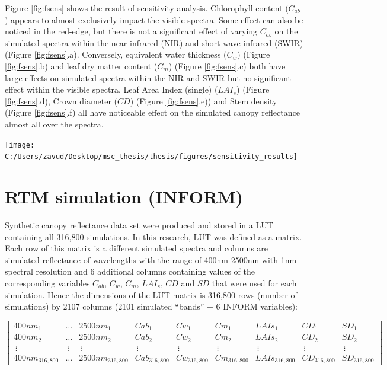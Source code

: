 \documentclass[a4paper, twoside]{templates/ociamthesis}
\let\origfigure\figure
\let\endorigfigure\endfigure
\renewenvironment{figure}[1][2] {
    \expandafter\origfigure\expandafter[H]
} {
    \endorigfigure
}
\begin{document}
Figure \ref{fig:fsens} shows the result of sensitivity analysis. Chlorophyll content (\(C_{ab}\)) appears to almost exclusively impact the visible spectra. Some effect can also be noticed in the red-edge, but there is not a significant effect of varying \(C_{ab}\) on the simulated spectra within the near-infrared (NIR) and short wave infrared (SWIR) (Figure \ref{fig:fsens}.a). Conversely, equivalent water thickness (\(C_{w}\)) (Figure \ref{fig:fsens}.b) and leaf dry matter content (\(C_{m}\)) (Figure \ref{fig:fsens}.c) both have large effects on simulated spectra within the NIR and SWIR but no significant effect within the visible spectra. Leaf Area Index (single) (\(LAI_{s}\)) (Figure \ref{fig:fsens}.d), Crown diameter (\(CD\)) (Figure \ref{fig:fsens}.e)) and Stem density (Figure \ref{fig:fsens}.f) all have noticeable effect on the simulated canopy reflectance almost all over the spectra.

\newpage

\begin{figure}

{\centering \texttt{[image: C:/Users/zavud/Desktop/msc\_thesis/thesis/figures/sensitivity\_results]} 

}

\caption{Effects of varying the chosen parameters on the simulated spectra}\label{fig:fsens}
\end{figure}

\newpage

\hypertarget{rtm-simulation-inform-1}{%
\section{RTM simulation (INFORM)}\label{rtm-simulation-inform-1}}

Synthetic canopy reflectance data set were produced and stored in a LUT containing all 316,800 simulations. In this research, LUT was defined as a matrix. Each row of this matrix is a different simulated spectra and columns are simulated reflectance of wavelengths with the range of 400nm-2500nm with 1nm spectral resolution and 6 additional columns containing values of the corresponding variables \(C_{ab}\), \(C_{w}\), \(C_{m}\), \(LAI_{s}\), \(CD\) and \(SD\) that were used for each simulation. Hence the dimensions of the LUT matrix is 316,800 rows (number of simulations) by 2107 columns (2101 simulated ``bands'' + 6 INFORM variables):

\begingroup
\tiny

\[
\begin{bmatrix}
400nm_{1} & \dots & 2500nm_{1} & Cab_{1} & Cw_{1} & Cm_{1} & LAIs_{1} & CD_{1} & SD_{1}\\
400nm_{2} & \dots & 2500nm_{2} & Cab_{2} & Cw_{2} & Cm_{2} & LAIs_{2} & CD_{2} & SD_{2}\\
\ \vdots  &\ \vdots &\ \vdots &\ \vdots &\ \vdots &\ \vdots &\ \vdots &\ \vdots &\ \vdots\\
400nm_{316,800} & \dots & 2500nm_{316,800} & Cab_{316,800} & Cw_{316,800} & Cm_{316,800} & LAIs_{316,800} & CD_{316,800} & SD_{316,800}
\end{bmatrix}
\]
\endgroup
\end{document}
